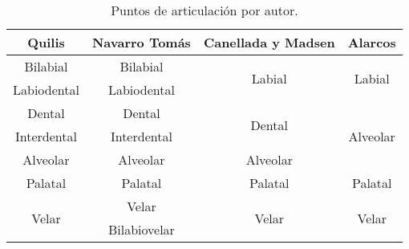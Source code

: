 \begin{table}[!ht]
	\centering\small
	\begin{tabular}{cccc}
		\toprule
		Quilis & 	Navarro Tomás & Canellada y Madsen & Alarcos \\
		\midrule
		Bilabial & Bilabial & \multirow{2}{*}{Labial}&\multirow{2}{*}{Labial} \\
		Labiodental & Labiodental &  & \\
		Dental & Dental&\multirow{2}{*}{Dental}&\multirow{3}{*}{Alveolar}\\
		Interdental & Interdental&&\\
		Alveolar &Alveolar&Alveolar&\\
		Palatal &Palatal&Palatal&Palatal \\
		\multirow{2}{*}{Velar} &Velar&\multirow{2}{*}{Velar}&\multirow{2}{*}{Velar}\\
		&Bilabiovelar & & \\
		\bottomrule
	\end{tabular}
	\caption{Puntos de articulación por autor.}
	\label{tab:compara-consonantes}
\end{table}

